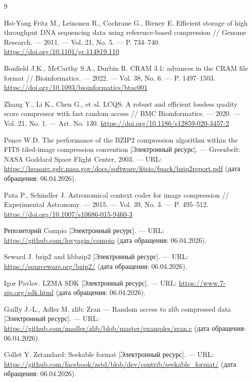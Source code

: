 \begin{thebibliography}{9}

    Hsi-Yang Fritz M., Leinonen R., Cochrane G., Birney E.
    Efficient storage of high throughput DNA sequencing data using reference-based compression //
    Genome Research. --- 2011. --- Vol. 21, No. 5. --- P. 734--740.
    \href{https://doi.org/10.1101/gr.114819.110}{https://doi.org/10.1101/gr.114819.110}

    Bonfield J.K., McCarthy S.A., Durbin R.
    CRAM 3.1: advances in the CRAM file format //
    Bioinformatics. --- 2022. --- Vol. 38, No. 6. --- P. 1497--1503.
    \href{https://doi.org/10.1093/bioinformatics/btac001}{https://doi.org/10.1093/bioinformatics/btac001}

    Zhang Y., Li K., Chen G., et al.
    LCQS: A robust and efficient lossless quality score compressor with fast random access //
    BMC Bioinformatics. --- 2020. --- Vol. 21, No. 1. --- Art. No. 130.
    \href{https://doi.org/10.1186/s12859-020-3457-2}{https://doi.org/10.1186/s12859-020-3457-2}

    Pence W.D.
    The performance of the BZIP2 compression algorithm within the FITS tiled-image compression convention
    [Электронный ресурс]. --- Greenbelt: NASA Goddard Space Flight Center, 2003. ---
    URL: \href{https://heasarc.gsfc.nasa.gov/docs/software/fitsio/fpack/bzip2report.pdf}{https://heasarc.gsfc.nasa.gov/docs/software/fitsio/fpack/bzip2report.pdf}
    (дата обращения: 06.04.2026).

    Pata P., Schindler J.
    Astronomical context coder for image compression //
    Experimental Astronomy. --- 2015. --- Vol. 39, No. 3. --- P. 495--512.
    \href{https://doi.org/10.1007/s10686-015-9460-3}{https://doi.org/10.1007/s10686-015-9460-3}

    Репозиторий Compio [Электронный ресурс]. ---
    URL: \href{https://github.com/lovyagin/compio}{https://github.com/lovyagin/compio}
    (дата обращения: 06.04.2026).

    Seward J.
    bzip2 and libbzip2 [Электронный ресурс]. ---
    URL: \href{https://sourceware.org/bzip2/}{https://sourceware.org/bzip2/}
    (дата обращения: 06.04.2026).

    Igor Pavlov.
    LZMA SDK [Электронный ресурс]. ---
    URL: \href{https://www.7-zip.org/sdk.html}{https://www.7-zip.org/sdk.html}
    (дата обращения: 06.04.2026).

    Gailly J.-L., Adler M.
    zlib: Zran --- Random access to zlib compressed data [Электронный ресурс]. ---
    URL: \href{https://github.com/madler/zlib/blob/master/examples/zran.c}{https://github.com/madler/zlib/blob/master/examples/zran.c}
    (дата обращения: 06.04.2026).

    Collet Y.
    Zstandard: Seekable format [Электронный ресурс]. ---
    URL: \href{https://github.com/facebook/zstd/blob/dev/contrib/seekable\_format/}{https://github.com/facebook/zstd/blob/dev/contrib/seekable\_format/}
    (дата обращения: 06.04.2026).

\end{thebibliography}